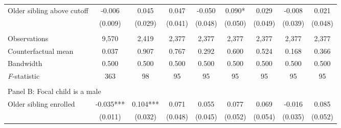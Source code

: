 \begin{table}[!htbp]
{{\begin{tabular}{lcccccccc}
Older sibling above cutoff&      -0.006   &       0.045   &       0.047   &      -0.050   &       0.090*  &       0.029   &      -0.008   &       0.021   \\
                    &     (0.009)   &     (0.029)   &     (0.041)   &     (0.048)   &     (0.050)   &     (0.049)   &     (0.039)   &     (0.048)   \\
                    &               &               &               &               &               &               &               &               \\
Observations        &       9,570   &       2,419   &       2,377   &       2,377   &       2,377   &       2,377   &       2,377   &       2,377   \\
Counterfactual mean &       0.037   &       0.907   &       0.767   &       0.292   &       0.600   &       0.524   &       0.168   &       0.366   \\
Bandwidth           &       0.500   &       0.500   &       0.500   &       0.500   &       0.500   &       0.500   &       0.500   &       0.500   \\
\textit{F}-statistic&         363   &          98   &          95   &          95   &          95   &          95   &          95   &          95   \\
 
&  &  &  &  \\
\multicolumn{10}{l}{Panel B: Focal child is a male} \\
Older sibling enrolled&      -0.035***&       0.104***&       0.071   &       0.055   &       0.077   &       0.069   &      -0.016   &       0.085   \\
                    &     (0.011)   &     (0.032)   &     (0.048)   &     (0.045)   &     (0.052)   &     (0.054)   &     (0.035)   &     (0.052)   \\
 

\end{tabular}}}
\end{table}
